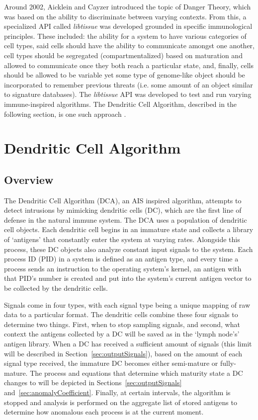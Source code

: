 \documentclass{umm-senior-sem}
\begin{document}
Around 2002, Aicklein and Cayzer introduced the topic of Danger Theory, which was based on the ability to discriminate between varying contexts. From this, a specialized API called \textit{libtissue} was developed grounded in specific immunological principles. These included: the ability for a system to have various categories of cell types, said cells should have the ability to communicate amongst one another, cell types should be segregated (compartmentalized) based on maturation and allowed to communicate once they both reach a particular state, and, finally, cells should be allowed to be variable yet some type of genome-like object should be incorporated to remember previous threats (i.e. some amount of an object similar to signature databases).  The \textit{libtissue} API was developed to test and run varying immune-inspired algorithms. The Dendritic Cell Algorithm, described in the following section, is one such approach
\cite{greensmith_thesis:2007}.

\section{Dendritic Cell Algorithm}
\label{sec:Dendritic Cell Algorithm}
\subsection{Overview}
The Dendritic Cell Algorithm (DCA), an AIS inspired algorithm, attempts to detect intrusions by mimicking dendritic cells (DC), which are the first line of defense in the natural immune system. The DCA uses a population of dendritic cell objects. Each dendritic cell begins in an immature state and collects a library of `antigens' that constantly enter the system at varying rates. Alongside this process, these DC objects also analyze constant input signals to the system. Each process ID (PID) in a system is defined as an antigen type, and every time a process sends an instruction to the operating system's kernel, an antigen with that PID's number is created and put into the system's current antigen vector to be collected by the dendritic cells. 

Signals come in four types, with each signal type being a unique mapping of raw data to a particular format. The dendritic cells combine these four signals to determine two things. First, when to stop sampling signals, and second, what context the antigens collected by a DC will be saved as in the `lymph node's' antigen library. When a DC has received a sufficient amount of signals (this limit will be described in Section~\ref{sec:outputSignals}), based on the amount of each signal type received, the immature DC becomes either semi-mature or fully-mature. The process and equations that determine which maturity state a DC changes to will be depicted in Sections~\ref{sec:outputSignals} and~\ref{sec:anomalyCoefficient}. Finally, at certain intervals, the algorithm is stopped and analysis is performed on the aggregate list of stored antigens to determine how anomalous each process is at the current moment.
\end{document}
